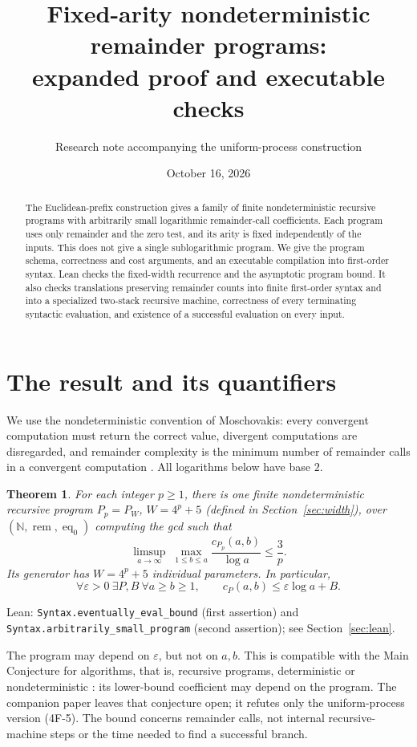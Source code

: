 \documentclass[11pt]{article}
\title{Fixed-arity nondeterministic remainder programs:\\expanded proof and executable checks}
\author{Research note accompanying the uniform-process construction}
\date{October 16, 2026}
\newtheorem{theorem}{Theorem}
\newcommand{\rem}{\operatorname{rem}}
\newcommand{\eqzero}{\operatorname{eq}_0}
\newcommand{\lean}[1]{\nolinkurl{#1}}
\begin{document}
\maketitle

\begin{abstract}
The Euclidean-prefix construction gives a family of finite nondeterministic
recursive programs with arbitrarily small logarithmic remainder-call
coefficients. Each program uses only remainder and the zero test, and its
arity is fixed independently of the inputs. This does not give a single
sublogarithmic program. We give the program schema, correctness and cost
arguments, and an executable compilation into first-order syntax.
Lean checks the fixed-width recurrence and the asymptotic program bound.
It also checks translations preserving remainder counts into finite
first-order syntax and into a specialized two-stack recursive machine,
correctness of every terminating syntactic evaluation, and existence of a
successful evaluation on every input.
\end{abstract}

\section{The result and its quantifiers}

We use the nondeterministic convention of Moschovakis: every convergent
computation must return the correct value, divergent computations are
disregarded, and remainder complexity is the minimum number of remainder
calls in a convergent computation \cite[\S2E, (2E-2), (2E-5)]{book}.
All logarithms below have base $2$.

\begin{theorem}\label{thm:family}
For each integer $p\geq1$, there is one finite nondeterministic recursive
program $P_p=P_W$, $W=4^p+5$ (defined in Section~\ref{sec:width}), over
$(\mathbb N,\rem,\eqzero)$ computing the gcd such that
\[
\limsup_{a\to\infty}\;
\max_{1\leq b\leq a}\frac{c_{P_p}(a,b)}{\log a}\leq\frac3p.
\]
Its generator has $W=4^p+5$ individual parameters. In particular,
\[
\forall\varepsilon>0\ \exists P, B\ \forall a\geq b\geq1,
\qquad c_P(a,b)\leq\varepsilon\log a+B.
\]
\end{theorem}
Lean: \lean{Syntax.eventually_eval_bound} (first assertion) and
\lean{Syntax.arbitrarily_small_program} (second assertion); see
Section~\ref{sec:lean}.

The program may depend on $\varepsilon$, but not on $a,b$.
This is compatible with the Main Conjecture for algorithms, that is,
recursive programs, deterministic or nondeterministic \cite[p.~2]{book}:
its lower-bound coefficient may depend on the program. The companion paper
leaves that conjecture open; it refutes only the uniform-process version
(4F-5).
The bound concerns remainder calls, not internal recursive-machine steps
or the time needed to find a successful branch.
\end{document}
